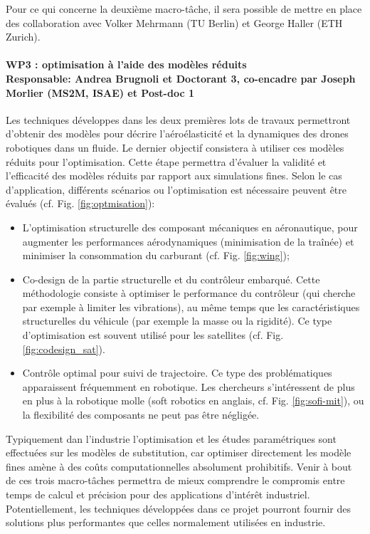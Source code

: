 \documentclass[12pt, french]{article}
\begin{document}
Pour ce qui concerne la deuxième macro-tâche, il sera possible de mettre en place des collaboration avec Volker Mehrmann (TU Berlin) et George Haller (ETH Zurich).


\paragraph{\large WP3 : optimisation à l'aide des modèles réduits\\
	Responsable: Andrea Brugnoli et Doctorant 3, co-encadre par Joseph Morlier (MS2M, ISAE) et Post-doc 1\\}

Les techniques développes dans les deux premières lots de travaux permettront d'obtenir des modèles pour décrire l'aéroélasticité et la dynamiques des drones robotiques dans un fluide.
Le dernier objectif consistera à utiliser ces modèles réduits pour l'optimisation. Cette étape permettra d’évaluer la validité et l’efficacité des modèles réduits par rapport aux simulations fines. Selon le cas d'application, différents scénarios ou l'optimisation est nécessaire peuvent être évalués (cf. Fig. \ref{fig:optmisation}): 
\begin{itemize}
	\item L'optimisation structurelle des composant mécaniques en aéronautique, pour augmenter les performances aérodynamiques (minimisation de la traînée) et minimiser la consommation du carburant (cf. Fig. \ref{fig:wing}); 
	\item Co-design de la partie structurelle et du contrôleur embarqué. Cette méthodologie consiste à optimiser le performance du contrôleur (qui cherche par exemple à limiter les vibrations), au même temps que les caractéristiques structurelles du véhicule (par exemple la masse ou la rigidité). Ce type d'optimisation est souvent utilisé pour les satellites (cf. Fig. \ref{fig:codesign_sat}).
	\item Contrôle optimal pour suivi de trajectoire. Ce type des problématiques apparaissent fréquemment en robotique. Les chercheurs s'intéressent de plus en plus à la robotique molle (soft robotics en anglais, cf. Fig. \ref{fig:sofi-mit}), ou la flexibilité des composants ne peut pas être négligée.
\end{itemize}

Typiquement dan l'industrie l'optimisation et les études paramétriques sont effectuées sur les
modèles de substitution, car optimiser directement les modèle fines amène à des coûts computationnelles absolument prohibitifs. Venir à bout de ces trois macro-tâches
permettra de mieux comprendre le compromis entre temps de calcul et précision pour des
applications d’intérêt industriel. Potentiellement, les techniques développées dans ce projet pourront fournir des solutions plus performantes que celles normalement utilisées en industrie.
\end{document}
